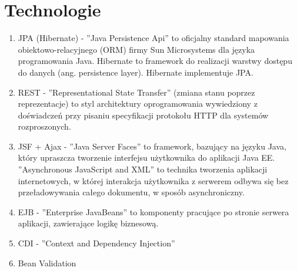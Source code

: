 \documentclass[a4paper]{article}
\begin{document}
\section{Technologie}
\begin{enumerate}
\item JPA (Hibernate) - ''Java Persistence Api'' to oficjalny standard mapowania obiektowo-relacyjnego (ORM) firmy Sun Microsystems dla języka programowania Java. Hibernate to framework do realizacji warstwy dostępu do danych (ang. persistence layer). Hibernate implementuje JPA.
\item REST - ''Representational State Transfer'' (zmiana stanu poprzez reprezentacje) to styl architektury oprogramowania wywiedziony z doświadczeń przy pisaniu specyfikacji protokołu HTTP dla systemów rozproszonych. 
\item JSF + Ajax - ''Java Server Faces'' to framework, bazujący na języku Java, który upraszcza tworzenie interfejsu użytkownika do aplikacji Java EE. ''Asynchronous JavaScript and XML'' to technika tworzenia aplikacji internetowych, w której interakcja użytkownika z serwerem odbywa się bez przeładowywania całego dokumentu, w sposób asynchroniczny.
\item EJB - ''Enterprise JavaBeans'' to komponenty pracujące po stronie serwera aplikacji, zawierające logikę biznesową.
\item CDI - ''Context and Dependency Injection''
\item Bean Validation 
\end{enumerate}
\end{document}
